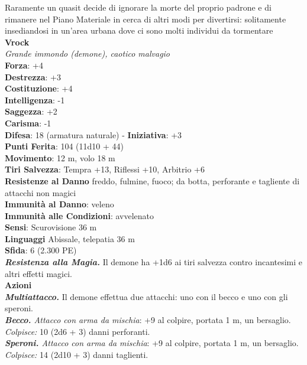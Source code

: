 \begin{multicols}{2}
Raramente un quasit decide di ignorare la morte del proprio padrone e di rimanere nel Piano Materiale in cerca di altri modi per divertirsi: solitamente insediandosi in un'area urbana dove ci sono molti individui da tormentare\\

\medskip\textbf{Vrock}\\
\emph{Grande immondo (demone), caotico malvagio}\\
\textbf{Forza}: +4\\
\textbf{Destrezza}: +3\\
\textbf{Costituzione}: +4\\
\textbf{Intelligenza}: -1\\
\textbf{Saggezza}: +2\\
\textbf{Carisma}: -1\\
\textbf{Difesa}: 18 (armatura naturale) - \textbf{Iniziativa}: +3\\
\textbf{Punti Ferita}: 104 (11d10 + 44)\\
\textbf{Movimento}: 12 m, volo 18 m\\
\textbf{Tiri Salvezza}: Tempra +13, Riflessi +10, Arbitrio +6\\
\textbf{Resistenze al Danno} freddo, fulmine, fuoco; da botta, perforante e tagliente di attacchi non magici\\
\textbf{Immunità al Danno}: veleno\\
\textbf{Immunità alle Condizioni}: avvelenato\\
\textbf{Sensi}: Scurovisione 36 m \\
\textbf{Linguaggi} Abissale, telepatia 36 m \\
\textbf{Sfida}: 6 (2.300 PE)\smallskip\\
\emph{\textbf{Resistenza alla Magia.}} Il demone ha +1d6 ai tiri salvezza contro incantesimi e altri effetti magici.\\
\smallskip\textbf{Azioni}\\
\emph{\textbf{Multiattacco.}} Il demone effettua due attacchi: uno con il becco e uno con gli speroni.\\
\emph{\textbf{Becco.} Attacco con arma da mischia}: +9 al colpire, portata 1 m, un bersaglio.\\
\emph{Colpisce:} 10 (2d6 + 3) danni perforanti.\\
\emph{\textbf{Speroni.} Attacco con arma da mischia}: +9 al colpire, portata 1 m, un bersaglio.\\
\emph{Colpisce:} 14 (2d10 + 3) danni taglienti.\\

\end{multicols}
